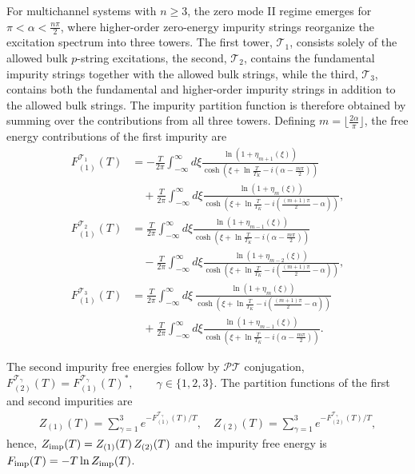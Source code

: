 \documentclass[aps,  prb,twocolumn,
  superscriptaddress,  floatfix,  10pt         
]{revtex4-2}
\begin{document}
For multichannel systems with $n\geq 3$, the zero mode II regime emerges for $\pi<\alpha<\frac{n\pi}{2}$, where higher-order zero-energy impurity strings reorganize the excitation spectrum into three towers. The first tower, $\mathscr T_1$, consists solely of the allowed bulk $p$-string excitations, the second, $\mathscr T_2$, contains the fundamental impurity strings together with the allowed bulk strings, while the third, $\mathscr T_3$, contains both the fundamental and higher-order impurity strings in addition to the allowed bulk strings. The impurity partition function is therefore obtained by summing over the contributions from all three towers. Defining $m=\lfloor\frac{2\alpha}{\pi}\rfloor$, the free energy contributions of the first impurity are
 \begin{subequations}\label{eq:tower-feng}
\begin{align}
F_{(1)}^{\mathscr{T}_1}(T) &= -\frac{T}{2\pi} \int_{-\infty}^{\infty}
d\xi \frac{\ln\left(1+\eta_{m+1}(\xi)\right)}{\cosh\left(\xi+\ln\frac{T}{T_K}-i\left(\alpha-\frac{m\pi}{2}\right)\right)}
\nonumber\\
&\quad
+\frac{T}{2\pi}\int_{-\infty}^{\infty}d\xi \frac{\ln\left(1+\eta_{m}(\xi)\right)}{\cosh\left(\xi+\ln\frac{T}{T_K}-i\left(\frac{(m+1)\pi}{2}-\alpha\right)\right)},\label{tower1-feng}\\
F_{(1)}^{\mathscr{T}_2}(T)&=\frac{T}{2\pi}\int_{-\infty}^{\infty}d\xi\frac{\ln\left(1+\eta_{m-1}(\xi)\right)}{\cosh\left(\xi+\ln\frac{T}{T_K}-i\left(\alpha-\frac{m\pi}{2}\right)\right)}
\nonumber\\
&\quad-\frac{T}{2\pi}\int_{-\infty}^{\infty}d\xi \frac{\ln\left(1+\eta_{m-2}(\xi)\right)}{\cosh\left(\xi+\ln\frac{T}{T_K}-i\left(\frac{(m+1)\pi}{2}-\alpha\right)\right)
},\label{tower2-feng}\\
F_{(1)}^{\mathscr{T}_3}(T)&=\frac{T}{2\pi}\int_{-\infty}^{\infty}d\xi\,
\frac{\ln\left(1+\eta_{m}(\xi)\right)}{\cosh\left(\xi+\ln\frac{T}{T_K}-i\left(\frac{(m+1)\pi}{2}-\alpha\right)\right)}\nonumber\\
&\quad+\frac{T}{2\pi}\int_{-\infty}^{\infty}d\xi\frac{\ln\left(1+\eta_{m-1}(\xi)\right)}{\cosh\left(\xi+\ln\frac{T}{T_K}-i\left(\alpha-\frac{m\pi}{2}\right)\right)}.\label{tower3-feng}
\end{align}
\end{subequations}


The second impurity free energies follow by $\mathscr{PT}$ conjugation, $F_{(2)}^{\mathscr{T}_\gamma}(T)=F_{(1)}^{\mathscr{T}_\gamma}(T)^{*},
\qquad
\gamma\in\{1,2,3\}$. The partition functions of the first and second impurities are
\begin{align}
Z_{(1)}(T)
=
\sum_{\gamma=1}^{3}
e^{-F_{(1)}^{\mathscr T_\gamma}(T)/T},\quad
Z_{(2)}(T)=
\sum_{\gamma=1}^{3}
e^{-F_{(2)}^{\mathscr T_\gamma}(T)/T},\nonumber
\end{align}
 hence, $Z_{\rm imp}(T)=Z_{(1)}(T)\,Z_{(2)}(T)$ and the impurity free energy is $F_{\rm imp}(T)=-T\ln Z_{\rm imp}(T)$.
\end{document}
